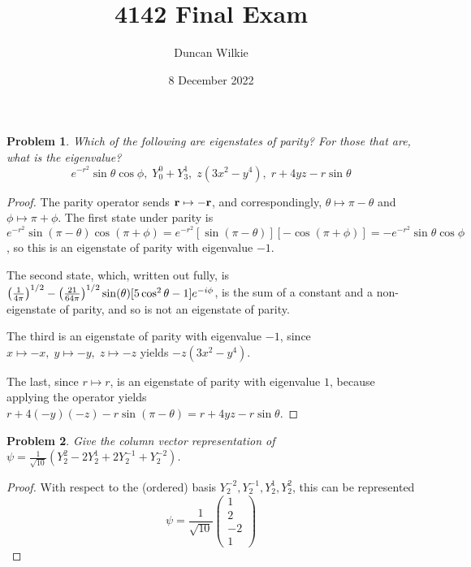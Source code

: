 \documentclass{article}
\title{4142 Final Exam}
\author{Duncan Wilkie}
\date{8 December 2022}
\newtheorem{plm}{Problem}
\begin{document}
\maketitle

\begin{plm}
  Which of the following are eigenstates of parity?
  For those that are, what is the eigenvalue?
  \[
    e^{-r^{2}}\sin\theta\cos\phi, \; Y_{0}^{0} + Y_{3}^{1}, \; z(3x^{2} - y^{4}), \; r + 4yz - r\sin\theta
  \]
\end{plm}

\begin{proof}
  The parity operator sends $\vb{r} \mapsto -\vb{r}$, and correspondingly, $\theta \mapsto \pi - \theta$ and $\phi \mapsto \pi + \phi$.
  The first state under parity is $e^{-r^{2}}\sin(\pi - \theta)\cos(\pi + \phi) = e^{-r^{2}}[\sin(\pi - \theta)][-\cos(\pi + \phi)]
  = -e^{-r^{2}}\sin\theta\cos\phi$, so this is an eigenstate of parity with eigenvalue $-1$.

  The second state, which, written out fully, is $\qty(\frac{1}{4\pi})^{1/2} - \qty(\frac{21}{64\pi})^{1/2}\sin(\theta)[5\cos^2\theta - 1]e^{-i\phi}$,
  is the sum of a constant and a non-eigenstate of parity, and so is not an eigenstate of parity.

  The third is an eigenstate of parity with eigenvalue $-1$, since $x \mapsto -x, \; y \mapsto -y, \; z \mapsto -z$ yields $-z(3x^{2} - y^{4})$.

  The last, since $r \mapsto r$, is an eigenstate of parity with eigenvalue $1$, because applying the operator yields $r + 4(-y)(-z)
  - r\sin(\pi - \theta) = r + 4yz - r\sin\theta$.
\end{proof}

\begin{plm}
  Give the column vector representation of $\psi = \frac{1}{\sqrt{10}}(Y_{2}^{2} - 2Y_{2}^{1} + 2Y_{2}^{-1} + Y_{2}^{-2})$.
\end{plm}

\begin{proof}
  With respect to the (ordered) basis $Y_{2}^{-2}, Y_{2}^{-1}, Y_{2}^{1}, Y_{2}^{2}$, this can be represented
  \[
    \psi = \frac{1}{\sqrt{10}}
    \begin{pmatrix}
      1 \\
      2 \\
      -2 \\
      1
    \end{pmatrix}
  \]
\end{proof}
\end{document}
